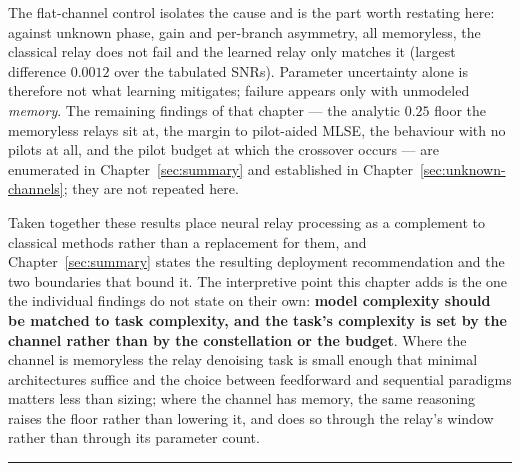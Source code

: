 The flat-channel control isolates the cause and is the part worth restating here: against unknown phase, gain and per-branch asymmetry, all memoryless, the classical relay does not fail and the learned relay only matches it (largest difference $0.0012$ over the tabulated SNRs). Parameter uncertainty alone is therefore not what learning mitigates; failure appears only with unmodeled \emph{memory}. The remaining findings of that chapter --- the analytic $0.25$ floor the memoryless relays sit at, the margin to pilot-aided MLSE, the behaviour with no pilots at all, and the pilot budget at which the crossover occurs --- are enumerated in Chapter~\ref{sec:summary} and established in Chapter~\ref{sec:unknown-channels}; they are not repeated here.

Taken together these results place neural relay processing as a complement to classical methods rather than a replacement for them, and Chapter~\ref{sec:summary} states the resulting deployment recommendation and the two boundaries that bound it. The interpretive point this chapter adds is the one the individual findings do not state on their own: \textbf{model complexity should be matched to task complexity, and the task's complexity is set by the channel rather than by the constellation or the budget}. Where the channel is memoryless the relay denoising task is small enough that minimal architectures suffice and the choice between feedforward and sequential paradigms matters less than sizing; where the channel has memory, the same reasoning raises the floor rather than lowering it, and does so through the relay's window rather than through its parameter count.

\begin{center}\rule{0.5\linewidth}{0.5pt}\end{center}
